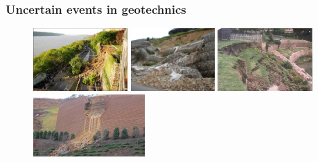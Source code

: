 \begin{frame}
	\frametitle{Uncertain events in geotechnics}
    \begin{figure}
    \includegraphics[height = 2.4cm]{figures/figure-geofailureone.jpg}    
    \includegraphics[height = 2.4cm]{figures/figure-geofailuretwo.jpg}  
    \includegraphics[height = 2.4cm]{figures/figure-geofailurethree.jpg}  
    \includegraphics[height = 2.4cm]{figures/figure-geofailurefour.jpg}  
    \tiny{}
    \end{figure}    
    
\end{frame}

